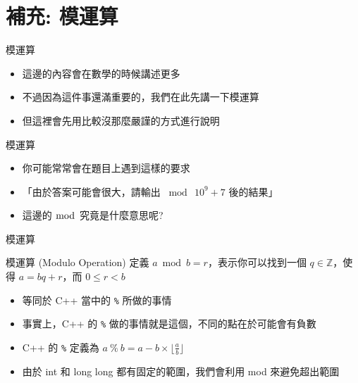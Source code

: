 \documentclass[aspectratio=169]{beamer}
\begin{document}
    \section{補充: 模運算}
    
    \begin{frame}{模運算}
        \begin{itemize}
            \item 這邊的內容會在數學的時候講述更多
            \item 不過因為這件事還滿重要的，我們在此先講一下模運算
            \item 但這裡會先用比較沒那麼嚴謹的方式進行說明
        \end{itemize}
    \end{frame}
    
    \begin{frame}{模運算}
        \begin{itemize}
            \item 你可能常常會在題目上遇到這樣的要求
            \item 「由於答案可能會很大，請輸出 $\bmod \ 10^9+7$ 後的結果」
            \item 這邊的 $\bmod$ 究竟是什麼意思呢?
        \end{itemize}
    \end{frame}
    
    \begin{frame}{模運算}
        \begin{block}{模運算 (Modulo Operation)}
            定義 $a \bmod b = r$，表示你可以找到一個 $q \in \mathbb{Z}$，使得 $a = bq+r$，而 $0 \le r < b$ 
            \begin{itemize}
                \item 等同於 C++ 當中的 \texttt{\%} 所做的事情
                \item 事實上，C++ 的 \texttt{\%} 做的事情就是這個，不同的點在於可能會有負數
                \item C++ 的 \texttt{\%} 定義為 $a \ \% \ b = a-b \times \Big \lfloor \frac{a}{b} \Big \rfloor$
                \item 由於 int 和 long long 都有固定的範圍，我們會利用 mod 來避免超出範圍
            \end{itemize}
        \end{block}
    \end{frame}
    
\end{document}
